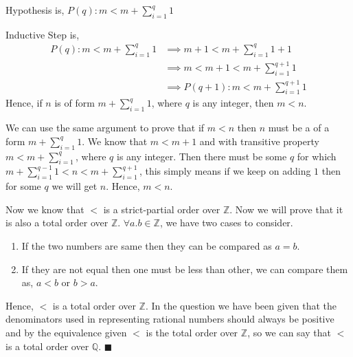 \documentclass[addpoints]{exam}
\theoremstyle{mytheoremstyle}
\theoremstyle{mytheoremstyle}
\theoremstyle{myproblemstyle}
\begin{document}
\begin{questions}
\begin{solution}
        Hypothesis is, \(\displaystyle P(q) : m<m+\sum_{i=1}^{q}1\)

        Inductive Step is,
        \begin{align*}
            P(q) : m<m+\sum_{i=1}^{q}1 & \implies m+1<m+\sum_{i=1}^{q}1+1      \\
                                       & \implies m<m+1<m+\sum_{i=1}^{q+1}1    \\
                                       & \implies P(q+1):m<m+\sum_{i=1}^{q+1}1
        \end{align*}
        Hence, if \(n\) is of form \(m+\sum_{i=1}^{q}1\), where \(q\) is any integer, then \(m<n\).

        We can use the same argument to prove that if \(m<n\) then \(n\) must be a of a form \(m+\sum_{i=1}^{q}1\). We know that \(m<m+1\) and with transitive property \(m<m+\sum_{i=1}^{q}\), where \(q\) is any integer. Then there must be some \(q\) for which \(m+\sum_{i=1}^{q-1}1<n<m+\sum_{i=1}^{q+1}\), this simply means if we keep on adding \(1\) then for some \(q\) we will get \(n\). Hence, \(m<n\).

        Now we know that \(<\) is a strict-partial order over \(\mathbb{Z}\). Now we will prove that it is also a total order over \(\mathbb{Z}\). \(\forall a.b\in\mathbb{Z}\), we have two cases to consider.
        \begin{enumerate}
            \item If the two numbers are same then they can be compared as \(a=b\).
            \item If they are not equal then one must be less than other, we can compare them as, \(a<b\) or \(b>a\).
        \end{enumerate}
        Hence, \(<\) is a total order over \(\mathbb{Z}\). In the question we have been given that the denominators used in representing rational numbers should always be positive and by the equivalence given \(<\) is the total order over \(\mathbb{Z}\), so we can say that \(<\) is a total order over \(\mathbb{Q}\). \hfill\(\blacksquare\)
    \end{solution}

    \newpage

    \question[1] \begin{parts}

\end{parts}
\end{questions}
\end{document}
